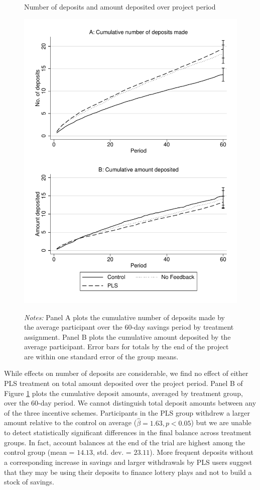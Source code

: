\documentclass[11pt]{article}
\begin{document}
		\begin{figure}[ht]
			\caption{Number of deposits and amount deposited over project period}
			\includegraphics[height=0.85\textheight]{../../figures/line-cumdeposits.pdf}
			\label{fig:line-cumdeposits}
			\caption*{\footnotesize \emph{Notes:} Panel A plots the cumulative number of deposits made by the average participant over the 60-day savings period by treatment assignment. Panel B plots the cumulative amount deposited by the average participant. Error bars for totals by the end of the project are within one standard error of the group means.}
		\end{figure}

		\clearpage

		While effects on number of deposits are considerable, we find no effect of either PLS treatment on total amount deposited over the project period. Panel B of Figure \ref{fig:line-cumdeposits} plots the cumulative deposit amounts, averaged by treatment group, over the 60-day period. We cannot distinguish total deposit amounts between any of the three incentive schemes. Participants in the PLS group withdrew a larger amount relative to the control on average ($\hat \beta = 1.63, p < 0.05$) but we are unable to detect statistically significant differences in the final balance across treatment groups. In fact, account balances at the end of the trial are highest among the control group (mean = $14.13$, std. dev. = $23.11$). More frequent deposits without a corresponding increase in savings and larger withdrawals by PLS users suggest that they may be using their deposits to finance lottery plays and not to build a stock of savings.
\end{document}
